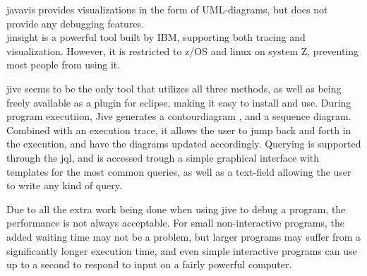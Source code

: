 \Gls{javavis} \cite{Oechsle2002} provides visualizations in the form of UML-diagrams, but does not provide any debugging features.
~\\

\Gls{jinsight} \cite{Pauw} is a powerful tool built by IBM, supporting both tracing and visualization.
However, it is restricted to z/OS and linux on system Z, preventing most people from using it.
~\\

\begin{sloppypar}
\Gls{jive} seems to be the only tool that utilizes all three methods, as well as being freely available as a plugin for eclipse, making it easy to install and use.
During program executiion, Jive generates a \gls{contourdiagram} \cite{Jayaraman1996}, and a sequence diagram.
Combined with an execution trace, it allows the user to jump back and forth in the execution, and have the diagrams updated accordingly.
Querying is supported through the \gls{jql}, and is accessed trough a simple graphical interface with templates for the most common queries, as well as a text-field allowing the user to write any kind of query.
~\\
\end{sloppypar}

Due to all the extra work being done when using jive to debug a program, the performance is not always acceptable.
For small non-interactive programs, the added waiting time may not be a problem, but larger programs may suffer from a significantly longer execution time, and even simple interactive programs can use up to a second to respond to input on a fairly powerful computer.
~\\





